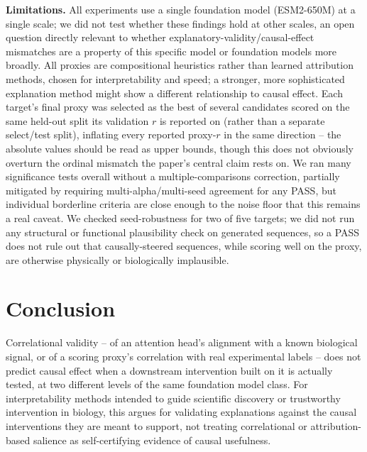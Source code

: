 \documentclass{article}
\begin{document}
\textbf{Limitations.} All experiments use a single foundation model
(ESM2-650M) at a single scale; we did not test whether these findings
hold at other scales, an open question directly relevant to whether
explanatory-validity/causal-effect mismatches are a property of this
specific model or foundation models more broadly. All proxies are
compositional heuristics rather than learned attribution methods, chosen
for interpretability and speed; a stronger, more sophisticated
explanation method might show a different relationship to causal effect.
Each target's final proxy was selected as the best of several candidates
scored on the same held-out split its validation $r$ is reported on
(rather than a separate select/test split), inflating every reported
proxy-$r$ in the same direction -- the absolute values should be read
as upper bounds, though this does not obviously overturn the ordinal
mismatch the paper's central claim rests on. We ran many significance
tests overall without a multiple-comparisons correction, partially
mitigated by requiring multi-alpha/multi-seed agreement for any PASS,
but individual borderline criteria are close enough to the noise floor
that this remains a real caveat. We checked seed-robustness for two of
five targets; we did not run any structural or functional plausibility
check on generated sequences, so a PASS does not rule out that
causally-steered sequences, while scoring well on the proxy, are
otherwise physically or biologically implausible.

\section{Conclusion}

Correlational validity -- of an attention head's alignment with a known
biological signal, or of a scoring proxy's correlation with real
experimental labels -- does not predict causal effect when a downstream
intervention built on it is actually tested, at two different levels of
the same foundation model class. For interpretability methods intended to
guide scientific discovery or trustworthy intervention in biology, this
argues for validating explanations against the causal interventions they
are meant to support, not treating correlational or attribution-based
salience as self-certifying evidence of causal usefulness.



\end{document}
